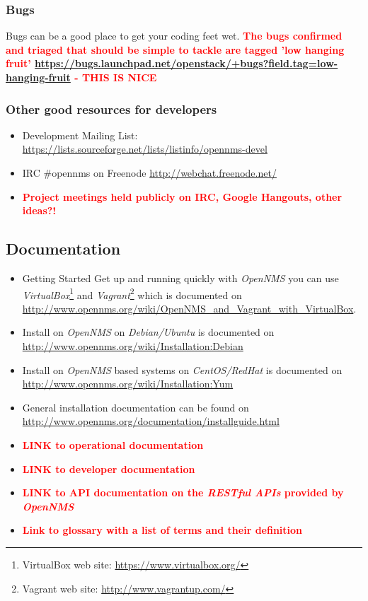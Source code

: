\subsubsection{Bugs}
Bugs can be a good place to get your coding feet wet. \textbf{\textcolor{red}{The bugs confirmed and triaged that should be simple to tackle are tagged 'low hanging fruit' \url{https://bugs.launchpad.net/openstack/+bugs?field.tag=low-hanging-fruit} - THIS IS NICE}}

\subsubsection{Other good resources for developers}
\begin{itemize}
  \item Development Mailing List: \url{https://lists.sourceforge.net/lists/listinfo/opennms-devel}
  \item IRC \#opennms on Freenode \url{http://webchat.freenode.net/}
  \item \textbf{\textcolor{red}{Project meetings held publicly on IRC, Google Hangouts, other ideas?!}}
\end{itemize}

\subsection{Documentation}
\begin{itemize}
  \item Getting Started Get up and running quickly with \emph{OpenNMS} you can use \emph{VirtualBox}\footnote{VirtualBox web site: \url{https://www.virtualbox.org/}} and \emph{Vagrant}\footnote{Vagrant web site: \url{http://www.vagrantup.com/}} which is documented on \url{http://www.opennms.org/wiki/OpenNMS_and_Vagrant_with_VirtualBox}.
  \item Install on \emph{OpenNMS} on \emph{Debian/Ubuntu} is documented on \url{http://www.opennms.org/wiki/Installation:Debian}
  \item Install on \emph{OpenNMS} based systems on \emph{CentOS/RedHat} is documented on \url{http://www.opennms.org/wiki/Installation:Yum}
  \item General installation documentation can be found on \url{http://www.opennms.org/documentation/installguide.html}
  \item \textbf{\textcolor{red}{LINK to operational documentation}}
  \item \textbf{\textcolor{red}{LINK to developer documentation}}
  \item \textbf{\textcolor{red}{LINK to API documentation on the \emph{RESTful APIs} provided by \emph{OpenNMS}}}
  \item \textbf{\textcolor{red}{Link to glossary with a list of terms and their definition}}
\end{itemize}

